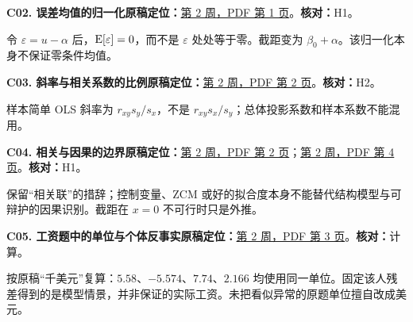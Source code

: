 \par\medskip\noindent\begin{minipage}{\linewidth}

\label{err:mean-normalisation}

\textbf{C02. 误差均值的归一化}\quad\textbf{原稿定位：}\hyperref[src:w2p1]{第 2 周，PDF 第 1 页}。\quad\textbf{核对：}H1。\par

令 $\varepsilon=u-\alpha$ 后，$\operatorname{E}[\varepsilon]=0$，而不是 $\varepsilon$ 处处等于零。截距变为 $\beta_0+\alpha$。该归一化本身不保证零条件均值。

\end{minipage}\par

\par\medskip\noindent\begin{minipage}{\linewidth}

\label{err:slope-correlation}

\textbf{C03. 斜率与相关系数的比例}\quad\textbf{原稿定位：}\hyperref[src:w2p2]{第 2 周，PDF 第 2 页}。\quad\textbf{核对：}H2。\par

样本简单 OLS 斜率为 $r_{xy}s_y/s_x$，不是 $r_{xy}s_x/s_y$；总体投影系数和样本系数不能混用。

\end{minipage}\par

\par\medskip\noindent\begin{minipage}{\linewidth}

\label{err:causality}

\textbf{C04. 相关与因果的边界}\quad\textbf{原稿定位：}\hyperref[src:w2p2]{第 2 周，PDF 第 2 页}；\hyperref[src:w2p4]{第 2 周，PDF 第 4 页}。\quad\textbf{核对：}H1。\par

保留“相关联”的措辞；控制变量、ZCM 或好的拟合度本身不能替代结构模型与可辩护的因果识别。截距在 $x=0$ 不可行时只是外推。

\end{minipage}\par

\par\medskip\noindent\begin{minipage}{\linewidth}

\label{err:wage-counterfactual}

\textbf{C05. 工资题中的单位与个体反事实}\quad\textbf{原稿定位：}\hyperref[src:w2p3]{第 2 周，PDF 第 3 页}。\quad\textbf{核对：}计算。\par

按原稿“千美元”复算：$5.58$、$-5.574$、$7.74$、$2.166$ 均使用同一单位。固定该人残差得到的是模型情景，并非保证的实际工资。未把看似异常的原题单位擅自改成美元。

\end{minipage}\par

